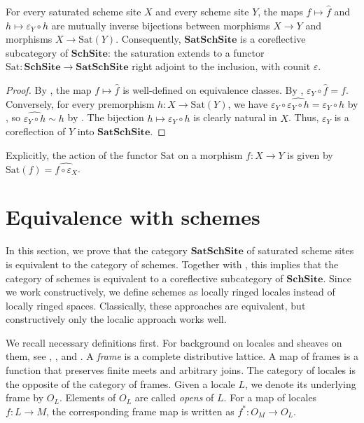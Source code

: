 \documentclass[reqno]{amsart}
\theoremstyle{definition}
\theoremstyle{remark}
\numberwithin{figure}{section}
\newcommand{\cat}[1]{\mathbf{#1}}
\begin{document}
\begin{thm}[coreflection]
For every saturated scheme site $X$ and every scheme site $Y$, the maps $f \mapsto \widehat{f}$ and $h \mapsto \varepsilon_Y \circ h$
are mutually inverse bijections between morphisms $X \to Y$ and morphisms $X \to \mathrm{Sat}(Y)$.
Consequently, $\cat{SatSchSite}$ is a coreflective subcategory of $\cat{SchSite}$:
the saturation extends to a functor $\mathrm{Sat} : \cat{SchSite} \to \cat{SatSchSite}$ right adjoint to the inclusion, with counit $\varepsilon$.
\end{thm}
\begin{proof}
By , the map $f \mapsto \widehat{f}$ is well-defined on equivalence classes.
By , $\varepsilon_Y \circ \widehat{f} = f$.
Conversely, for every premorphism $h : X \to \mathrm{Sat}(Y)$, we have $\varepsilon_Y \circ \widehat{\varepsilon_Y \circ h} = \varepsilon_Y \circ h$ by ,
so $\widehat{\varepsilon_Y \circ h} \sim h$ by .
The bijection $h \mapsto \varepsilon_Y \circ h$ is clearly natural in $X$.
Thus, $\varepsilon_Y$ is a coreflection of $Y$ into $\cat{SatSchSite}$.
\end{proof}

Explicitly, the action of the functor $\mathrm{Sat}$ on a morphism $f : X \to Y$ is given by $\mathrm{Sat}(f) = \widehat{f \circ \varepsilon_X}$.

\section{Equivalence with schemes}
\label{sec:equivalence}

In this section, we prove that the category $\cat{SatSchSite}$ of saturated scheme sites is equivalent to the category of schemes.
Together with , this implies that the category of schemes is equivalent to a coreflective subcategory of $\cat{SchSite}$.
Since we work constructively, we define schemes as locally ringed locales instead of locally ringed spaces.
Classically, these approaches are equivalent, but constructively only the localic approach works well.

We recall necessary definitions first.
For background on locales and sheaves on them, see \cite[Chapter~II]{stone-spaces}, \cite[Part~C]{elephant}, and \cite{maclane-moerdijk}.
A \emph{frame} is a complete distributive lattice.
A map of frames is a function that preserves finite meets and arbitrary joins.
The category of locales is the opposite of the category of frames.
Given a locale $L$, we denote its underlying frame by $O_L$.
Elements of $O_L$ are called \emph{opens} of $L$.
For a map of locales $f : L \to M$, the corresponding frame map is written as $f^* : O_M \to O_L$.
\end{document}
